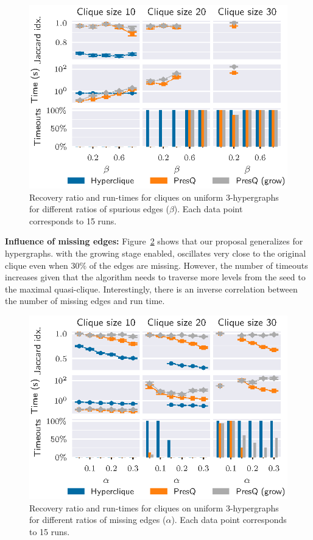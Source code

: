 \begin{figure}[ht]
    \centering
    \includegraphics{images/5_presq/3hyper_beta}
    \caption[Recovery ratio and run-times for cliques on uniform $3$-hypergraphs for different ratios of spurious edges.]{
        Recovery ratio and run-times for cliques on uniform $3$-hypergraphs
        for different ratios of spurious edges ($\beta$).
        Each data point corresponds to 15 runs.
    }
    \label{fig:3hyper_beta}
\end{figure}

\textbf{Influence of missing edges:}
Figure~\ref{fig:3hyper_alpha} shows that our proposal
generalizes for hypergraphs. \PresQ with the growing stage enabled, oscillates very close
to the original clique even when $30\%$ of the edges are missing. However, the number of
timeouts increases given that the algorithm needs to traverse more levels from the seed to the maximal
quasi-clique. Interestingly, there is an inverse correlation between the number
of missing edges and run time.

\begin{figure}[ht]
    \centering
    \includegraphics{images/5_presq/3hyper_alpha}
    \caption[Recovery ratio and run-times for cliques on uniform $3$-hypergraphs
    for different ratios of missing edges.]{Recovery ratio and run-times for cliques on uniform $3$-hypergraphs
    for different ratios of missing edges ($\alpha$).
    Each data point corresponds to 15 runs.}
    \label{fig:3hyper_alpha}
\end{figure}


